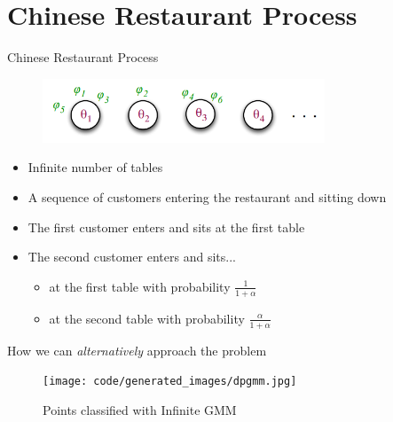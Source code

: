 \documentclass[handout]{beamer}
\begin{document}
\section{Chinese Restaurant Process}
\begin{frame}{Chinese Restaurant Process}

    \begin{figure}[H]
        \centering
        \includegraphics[width=0.75\textwidth]{figures/crp2.png}\par
    \end{figure}

    \begin{itemize}
        \item Infinite number of tables
        \item A sequence of customers entering the restaurant and sitting down
        \item The first customer enters and sits at the first table
        \item The second customer enters and sits...
            \begin{itemize}
                \item at the first table with probability $\frac{1}{1 + \alpha}$
                \item at the second table with probability $\frac{\alpha}{1 + \alpha}$
            \end{itemize}
    \end{itemize}
\end{frame}


\begin{frame}{How we can \textit{alternatively} approach the problem}
    {\centering
    \begin{figure}[H]
        \texttt{[image: code/generated\_images/dpgmm.jpg]}
        \caption{Points classified with Infinite GMM}
    \end{figure}
    }
\end{frame}
\end{document}
